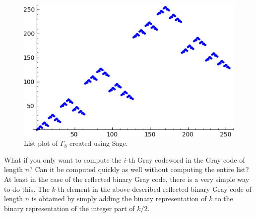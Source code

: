 \begin{figure}[!htbp]
\centering
\includegraphics{image/graycode-gamma8}
\caption{List plot of $\Gamma_8$ created using Sage.}
\label{}
\end{figure}

What if you only want to compute the
$i$-th Gray codeword in the Gray code of length $n$?
Can it be computed quickly as well without computing the
entire list?
At least in the case of the reflected binary Gray code, there
is a very simple way to do this. The $k$-th element in the
above-described reflected binary Gray code of length $n$
is obtained by simply adding the binary representation of
$k$ to the binary representation of the integer part of
$k/2$.

